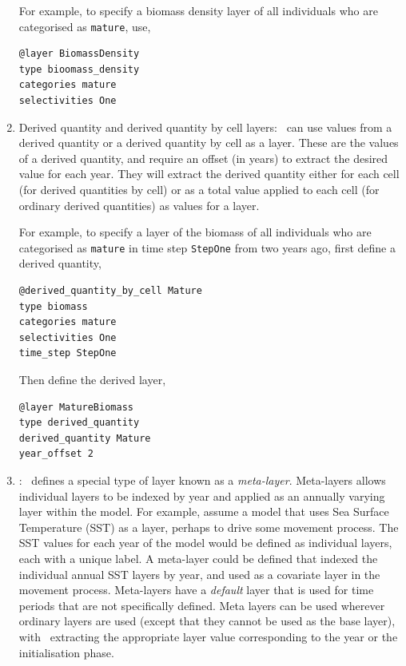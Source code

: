 \begin{enumerate}
For example, to specify a biomass density layer of all individuals who are categorised as \texttt{mature}, use,
{\small{\begin{verbatim}
@layer BiomassDensity
type bioomass_density
categories mature
selectivities One
\end{verbatim}}}

\item {Derived quantity and derived quantity by cell layers}\label{derived quantity layer}: \SPM\ can use values from a derived quantity or a derived quantity by cell as a layer. These are the values of a derived quantity, and require an offset (in years) to extract the desired value for each year. They will extract the derived quantity either for each cell (for derived quantities by cell) or as a total value applied to each cell (for ordinary derived quantities) as values for a layer.

For example, to specify a layer of the biomass of all individuals who are categorised as \texttt{mature} in time step \texttt{StepOne} from two years ago, first define a derived quantity,
{\small{\begin{verbatim}
@derived_quantity_by_cell Mature
type biomass
categories mature
selectivities One
time_step StepOne
\end{verbatim}}}

Then define the derived layer,
{\small{\begin{verbatim}
@layer MatureBiomass
type derived_quantity
derived_quantity Mature
year_offset 2
\end{verbatim}}}

\item {\label{meta-layers}}: \SPM\ defines a special type of layer known as a \emph{meta-layer}. Meta-layers allows individual layers to be indexed by year and applied as an annually varying layer within the model. For example, assume a model that uses Sea Surface Temperature (SST) as a layer, perhaps to drive some movement process. The SST values for each year of the model would be defined as individual layers, each with a unique label. A meta-layer could be defined that indexed the individual annual SST layers by year, and used as a covariate layer in the movement process. Meta-layers have a \emph{default} layer that is used for time periods that are not specifically defined. Meta layers can be used wherever ordinary layers are used (except that they cannot be used as the base layer), with \SPM\ extracting the appropriate layer value corresponding to the year or the initialisation phase.


\end{enumerate}
